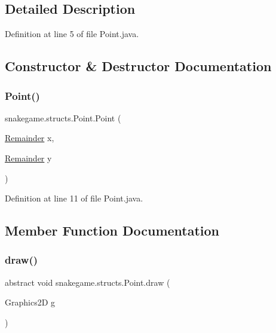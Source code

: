 \subsection{Detailed Description}


Definition at line 5 of file Point.\+java.



\subsection{Constructor \& Destructor Documentation}
\mbox{\label{classsnakegame_1_1structs_1_1_point_a79325ac308e18b3dd2721fcfa44752bd}} 
\subsubsection{\texorpdfstring{Point()}{Point()}}
{\footnotesize\ttfamily snakegame.\+structs.\+Point.\+Point (\begin{DoxyParamCaption}\item[{\mbox{\hyperlink{classsnakegame_1_1structs_1_1_remainder}{Remainder}}}]{x,  }\item[{\mbox{\hyperlink{classsnakegame_1_1structs_1_1_remainder}{Remainder}}}]{y }\end{DoxyParamCaption})}



Definition at line 11 of file Point.\+java.



\subsection{Member Function Documentation}
\mbox{\label{classsnakegame_1_1structs_1_1_point_ab90de88df6692023c7e156d45f3e5417}} 
\subsubsection{\texorpdfstring{draw()}{draw()}}
{\footnotesize\ttfamily abstract void snakegame.\+structs.\+Point.\+draw (\begin{DoxyParamCaption}\item[{Graphics2D}]{g }\end{DoxyParamCaption})\hspace{0.3cm}{\ttfamily [abstract]}}

